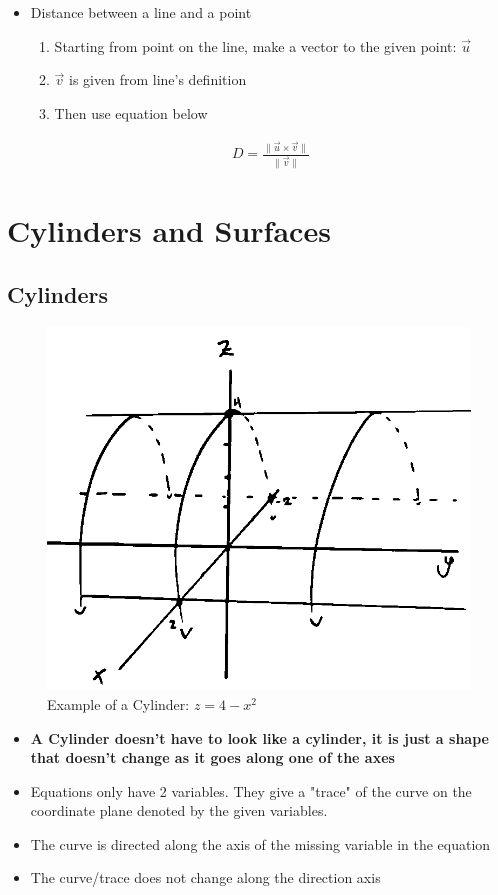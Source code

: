 \documentclass{article}
\begin{document}
\begin{itemize}
  \item Distance between a line and a point
  \begin{enumerate}
    \item Starting from point on the line, make a vector to the given point: $\vec{u}$
    \item $\vec{v}$ is given from line's definition
    \item Then use equation below
  \end{enumerate}
  \begin{align}
    D = \frac{\|\vec{u}\times\vec{v}\|}{\|\vec{v}\|}
  \end{align}
\end{itemize}


\section{Cylinders and Surfaces}
\subsection{Cylinders}
\begin{figure}[h]
  \includegraphics[scale=0.4]{cylinder-3D}
  \centering
  \caption{Example of a Cylinder: $z = 4 - x^2$}
  \label{fig:cylinder-3D}
\end{figure}
\begin{itemize}
  \item \textbf{A Cylinder doesn't have to look like a cylinder, it is just a shape that doesn't change as it goes along one of the axes}
  \item Equations only have 2 variables. They give a "trace" of the curve on the coordinate plane denoted by the given variables.
  \item The curve is directed along the axis of the missing variable in the equation
  \item The curve/trace does not change along the direction axis
\end{itemize}
\end{document}
